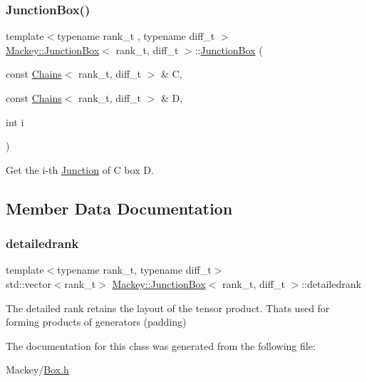 \subsubsection{\texorpdfstring{Junction\+Box()}{JunctionBox()}}
{\footnotesize\ttfamily template$<$typename rank\+\_\+t , typename diff\+\_\+t $>$ \\
\hyperlink{classMackey_1_1JunctionBox}{Mackey\+::\+Junction\+Box}$<$ rank\+\_\+t, diff\+\_\+t $>$\+::\hyperlink{classMackey_1_1JunctionBox}{Junction\+Box} (\begin{DoxyParamCaption}\item[{const \hyperlink{classMackey_1_1Chains}{Chains}$<$ rank\+\_\+t, diff\+\_\+t $>$ \&}]{C,  }\item[{const \hyperlink{classMackey_1_1Chains}{Chains}$<$ rank\+\_\+t, diff\+\_\+t $>$ \&}]{D,  }\item[{int}]{i }\end{DoxyParamCaption})}



Get the i-\/th \hyperlink{classMackey_1_1Junction}{Junction} of C box D. 



\subsection{Member Data Documentation}
\mbox{\label{classMackey_1_1JunctionBox_ae1bd899e721eebc9b22ccccf506e774e}} 
\subsubsection{\texorpdfstring{detailedrank}{detailedrank}}
{\footnotesize\ttfamily template$<$typename rank\+\_\+t, typename diff\+\_\+t$>$ \\
std\+::vector$<$rank\+\_\+t$>$ \hyperlink{classMackey_1_1JunctionBox}{Mackey\+::\+Junction\+Box}$<$ rank\+\_\+t, diff\+\_\+t $>$\+::detailedrank}



The detailed rank retains the layout of the tensor product. That\textquotesingle{}s used for forming products of generators (padding) 



The documentation for this class was generated from the following file\+:\begin{DoxyCompactItemize}
\item 
Mackey/\hyperlink{Box_8h}{Box.\+h}\end{DoxyCompactItemize}
